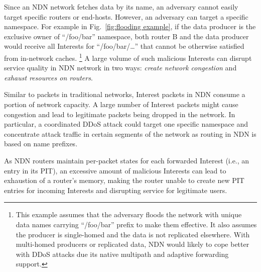 \documentclass[10pt,conference]{IEEEtran}
\newcommand{\ndnName}[1]{``{\nicettfont #1}''}
\begin{document}
Since an NDN network fetches data by its name, an adversary cannot easily target specific routers or end-hosts.
However, an adversary can target a specific namespace.
For example in Fig.~\ref{fig:flooding example}, if the data producer is the exclusive owner of \ndnName{/foo/bar} namespace, both router B and the data producer would receive all Interests for \ndnName{/foo/bar/\ldots} that cannot be otherwise satisfied from in-network caches.%
\footnote {This example assumes that the adversary floods the network with unique data names carrying \ndnName{\small /foo/bar} prefix to make them effective. It also assumes the producer is single-homed and the data is not replicated elsewhere. With multi-homed producers or replicated data, NDN would likely to cope better with DDoS attacks due its native multipath and adaptive forwarding~\cite{adaptive-forwarding} support.}
A large volume of such malicious Interests can disrupt service quality in NDN network in two ways: \emph{create network congestion} and \emph{exhaust resources on routers}.

Similar to packets in traditional networks, Interest packets in NDN consume a portion of network capacity. A large number of Interest packets might cause congestion and lead to legitimate packets being dropped in the network. In particular, a coordinated DDoS attack could target one specific namespace and concentrate attack traffic in certain segments of the network as routing in NDN is based on name prefixes. 


As NDN routers maintain per-packet states for each forwarded Interest (i.e., an entry in its PIT), an excessive amount of malicious Interests can lead to exhaustion of a router's memory, making the router unable to create new PIT entries for incoming Interests and disrupting service for legitimate users.
\end{document}
